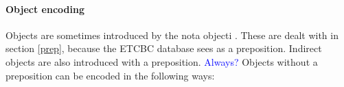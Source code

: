 \documentclass{report}
\newcommand{\hebr}[1]{\hbox{\cjRL{#1}}}
\begin{document}
%
%
%

\paragraph{Object encoding}
Objects are sometimes introduced by the nota objecti \hebr{>T}. These are dealt with in section \ref{prep}, because the ETCBC database sees \hebr{>T} as a preposition. Indirect objects are also introduced with a preposition. \textcolor{blue}{Always?} Objects without a preposition can be encoded in the following ways:
\end{document}

